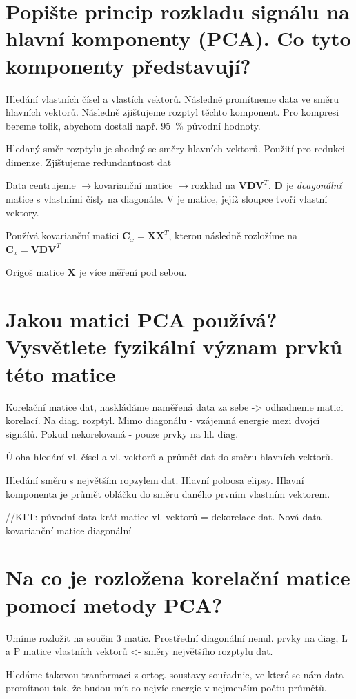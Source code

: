 \documentclass[a4paper,12pt]{article}   %
\newcommand{\rrarr}{$\rightarrow$}
\newcommand{\mt}[1]{$#1$}
\begin{document}
\section{Popište princip rozkladu signálu na hlavní komponenty (PCA). Co tyto komponenty představují?}
Hledání vlastních čísel a vlastích vektorů. Následně promítneme data ve směru hlavních vektorů. Následně zjišťujeme rozptyl těchto komponent. Pro kompresi bereme tolik, abychom dostali např. 95~\% původní hodnoty.

Hledaný směr rozptylu je shodný se směry hlavních vektorů. Použití pro redukci dimenze. Zjištujeme redundantnost dat

Data centrujeme \rrarr kovarianční matice \rrarr rozklad na \mt{\pmb{VDV}^T}. \mt{\pmb D} je \textit{doagonální} matice s vlastními čísly na diagonále. V je matice, jejíž sloupce tvoří vlastní vektory. 

Používá kovarianční matici \mt{\pmb C_x = \pmb{XX}^T}, kterou následně rozložíme na \mt{\pmb C_x = \pmb{VDV}^T}

Origoš matice \mt{\pmb X} je více měření pod sebou. 



\section{Jakou matici PCA používá? Vysvětlete fyzikální význam prvků této matice}
Korelační matice dat, naskládáme naměřená data za sebe -> odhadneme matici korelací. Na diag. rozptyl. Mimo diagonálu - vzájemná energie mezi dvojcí signálů. Pokud nekorelovaná - pouze prvky na hl. diag. 

Úloha hledání vl. čísel a vl. vektorů a průmět dat do směru hlavních vektorů.

Hledání směru s největším ropzylem dat. Hlavní poloosa elipsy. Hlavní komponenta je průmět obláčku do směru daného prvním vlastním vektorem. 

//KLT: původní data krát matice vl. vektorů = dekorelace dat. Nová data kovarianční matice diagonální


\section{Na co je rozložena korelační matice pomocí metody PCA?}
Umíme rozložit na součin 3 matic. Prostřední diagonální nenul. prvky na diag, L a P matice vlastních vektorů <- směry největšího rozptylu dat. 

Hledáme takovou tranformaci z ortog. soustavy souřadnic, ve které se nám data promítnou tak, že budou mít co nejvíc energie v nejmenším počtu průmětů. 
\end{document}
